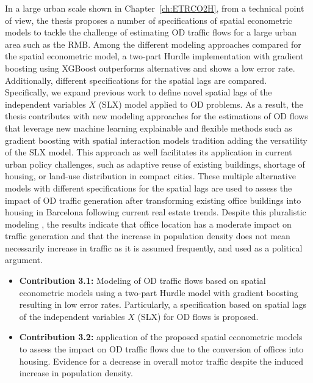 In a large urban scale shown in Chapter~\ref{ch:ETRCO2H}, from a technical point of view, the thesis proposes a number of specifications of spatial econometric models to tackle the challenge of estimating OD traffic flows for a large urban area such as the RMB. Among the different modeling approaches compared for the spatial econometric model, a two-part Hurdle implementation with gradient boosting using XGBoost outperforms alternatives and shows a low error rate. Additionally, different specifications for the spatial lags \citep{LeSage2008SpatialFlows} are compared. Specifically, we expand previous work to define novel spatial lags of the independent variables $X$ (SLX) model applied to OD problems. As a result, the thesis contributes with new modeling approaches for the estimations of OD flows that leverage new machine learning explainable and flexible methods such as gradient boosting with spatial interaction models tradition adding the versatility of the SLX model. This approach as well facilitates its application in current urban policy challenges, such as adaptive reuse of existing buildings, shortage of housing, or land-use distribution in compact cities. These multiple alternative models with different specifications for the spatial lags are used to assess the impact of OD traffic generation after transforming existing office buildings into housing in Barcelona following current real estate trends. Despite this pluralistic modeling \citep{Helbing2013,Page2018,Batty2019_maptNotTerritory}, the results indicate that office location has a moderate impact on traffic generation and that the increase in population density does not mean necessarily increase in traffic as it is assumed frequently, and used as a political argument.

\begin{itemize}
    \item \textbf{Contribution 3.1:} Modeling of OD traffic flows based on spatial econometric models using a two-part Hurdle model with gradient boosting resulting in low error rates. Particularly, a specification based on spatial lags of the independent variables $X$ (SLX) for OD flows is proposed.
    \item \textbf{Contribution 3.2:} application of the proposed spatial econometric models to assess the impact on OD traffic flows due to the conversion of offices into housing. Evidence for a decrease in overall motor traffic despite the induced increase in population density. 
\end{itemize}

